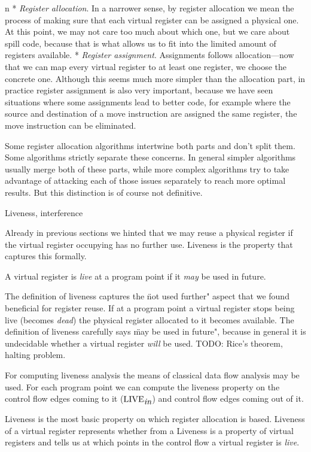 \begitems\style n
* {\em Register allocation}. In a narrower sense, by register allocation we mean
the process of making sure that each virtual register can be assigned a physical
one. At this point, we may not care too much about which one, but we care about
spill code, because that is what allows us to fit into the limited amount of
registers available.
* {\em Register assignment}. Assignments follows allocation---now that we
can map every virtual register to at least one register, we choose the
concrete one. Although this seems much more simpler than the allocation part,
in practice register assignment is also very important, because we have seen
situations where some assignments lead to better code, for example where the
source and destination of a move instruction are assigned the same register, the
move instruction can be eliminated.
\enditems

Some register allocation algorithms intertwine both parts and don't split them.
Some algorithms strictly separate these concerns. In general simpler algorithms
usually merge both of these parts, while more complex algorithms try to take
advantage of attacking each of those issues separately to reach more optimal
results. But this distinction is of course not definitive.

\seccc Liveness, interference

Already in previous sections we hinted that we may reuse a physical register if
the virtual register occupying has no further use. Liveness is the property that
captures this formally.

A virtual register is {\em live} at a program point if it {\em may} be used in
future.

The definition of liveness captures the \"not used further" aspect that we found
beneficial for register reuse. If at a program point a virtual register stops
being live (becomes {\em dead}) the physical register allocated to it becomes
available. The definition of liveness carefully says \"may be used in future",
because in general it is undecidable whether a virtual register {\em will} be
used. TODO: Rice's theorem, halting problem.

For computing liveness analysis the means of classical data flow analysis may be
used. For each program point we can compute the liveness property on the control
flow edges coming to it ($\hbox{LIVE}_{\hbox{\it in}}$) and control flow edges
coming out of it.

Liveness is the most basic property on which register allocation is based.
Liveness of a virtual register represents whether from a 
Liveness is a property of virtual registers and tells us at which points in the
control flow a virtual register is {\em live}.

